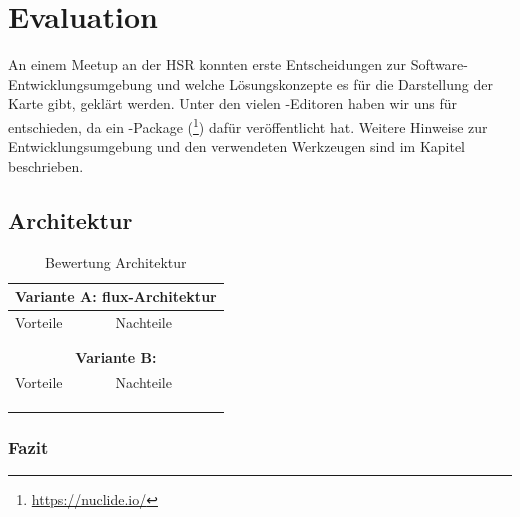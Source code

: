 \chapter{Evaluation}
\label{tb-evaluation}
An einem  Meetup an der HSR konnten erste Entscheidungen zur Software-Entwicklungsumgebung und welche Lösungskonzepte es für die Darstellung der Karte gibt, geklärt werden.
Unter den vielen -Editoren haben wir uns für  entschieden, da  ein -Package (\footnote{\url{https://nuclide.io/}}) dafür veröffentlicht hat. 
Weitere Hinweise zur Entwicklungsumgebung und den verwendeten Werkzeugen sind im Kapitel  beschrieben.

\section{Architektur}
\begin{table}[H]
\centering
\label{tb-evaluation-architektur}
\begin{tabular}{|p{7cm}|p{7cm}|}
\hline
\multicolumn{2}{|c|}{\textbf{Variante A: flux-Architektur}} \\
\hline
Vorteile & Nachteile \\
\hline
  &  \\
\hline
  &  \\
\hline
\multicolumn{2}{|c|}{\textbf{Variante B: }} \\
\hline
Vorteile & Nachteile \\
\hline
  &  \\
\hline
  &  \\
\hline
  &  \\
\hline
\end{tabular}
\caption{Bewertung Architektur}
\end{table}

\subsection{Fazit}

